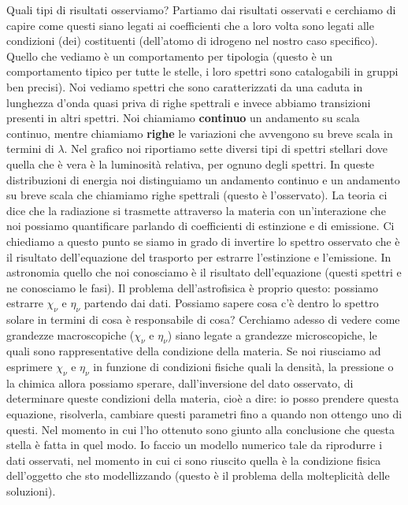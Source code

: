 \documentclass[a4paper,11pt]{article}
\begin{document}
Quali tipi di risultati osserviamo? Partiamo dai risultati osservati e cerchiamo di capire come questi siano legati ai coefficienti che a loro volta sono legati alle condizioni (dei) costituenti (dell'atomo di idrogeno nel nostro caso specifico). Quello che vediamo è un comportamento per tipologia (questo è un comportamento tipico per tutte le stelle, i loro spettri sono catalogabili in gruppi ben precisi).
\newline
Noi vediamo spettri che sono caratterizzati da una caduta in lunghezza d'onda quasi priva di righe spettrali e invece abbiamo transizioni presenti in altri spettri. Noi chiamiamo \textbf{continuo} un andamento su scala continuo, mentre chiamiamo \textbf{righe} le variazioni che avvengono su breve scala in termini di $\lambda$.
\newline
Nel grafico noi riportiamo sette diversi tipi di spettri stellari dove quella che è vera è la luminosità relativa, per ognuno degli spettri. In queste distribuzioni di energia noi distinguiamo un andamento continuo e un andamento su breve scala che chiamiamo righe spettrali (questo è l'osservato). La teoria ci dice che la radiazione si trasmette attraverso la materia con un'interazione che noi possiamo quantificare parlando di coefficienti di estinzione e di emissione. Ci chiediamo a questo punto se siamo in grado di invertire lo spettro osservato che è il risultato dell'equazione del trasporto per estrarre l'estinzione e l'emissione.
\newline
In astronomia quello che noi conosciamo è il risultato dell'equazione (questi spettri e ne conosciamo le fasi). Il problema dell'astrofisica è proprio questo: possiamo estrarre $\chi_\nu$ e $\eta_\nu$ partendo dai dati. Possiamo sapere cosa c'è dentro lo spettro solare in termini di cosa è responsabile di cosa?
\newline
Cerchiamo adesso di vedere come grandezze macroscopiche ($\chi_\nu$ e $\eta_\nu$) siano legate a grandezze microscopiche, le quali sono rappresentative della condizione della materia. Se noi riusciamo ad esprimere $\chi_\nu$ e $\eta_\nu$ in funzione di condizioni fisiche quali la densità, la pressione o la chimica allora possiamo sperare, dall'inversione del dato osservato, di determinare queste condizioni della materia, cioè a dire: io posso prendere questa equazione, risolverla, cambiare questi parametri fino a quando non ottengo uno di questi. Nel momento in cui l'ho ottenuto sono giunto alla conclusione che questa stella è fatta in quel modo.
\newline
Io faccio un modello numerico tale da riprodurre i dati osservati, nel momento in cui ci sono riuscito quella è la condizione fisica dell'oggetto che sto modellizzando (questo è il problema della molteplicità delle soluzioni).
\end{document}
